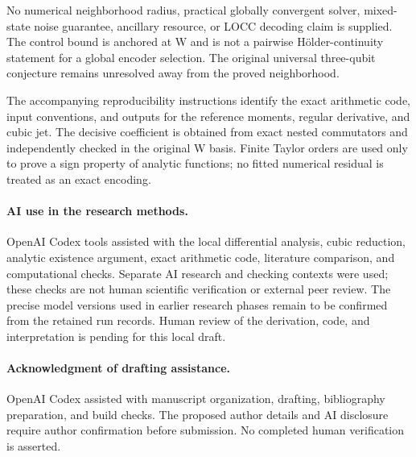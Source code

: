 \documentclass[11pt]{article}
\begin{document}
No numerical neighborhood radius, practical globally convergent solver, mixed-state noise guarantee, ancillary resource, or LOCC decoding claim is supplied. The control bound is anchored at W and is not a pairwise H\"older-continuity statement for a global encoder selection. The original universal three-qubit conjecture remains unresolved away from the proved neighborhood.

The accompanying reproducibility instructions identify the exact arithmetic code, input conventions, and outputs for the reference moments, regular derivative, and cubic jet. The decisive coefficient is obtained from exact nested commutators and independently checked in the original W basis. Finite Taylor orders are used only to prove a sign property of analytic functions; no fitted numerical residual is treated as an exact encoding.

\paragraph{AI use in the research methods.}
OpenAI Codex tools assisted with the local differential analysis, cubic reduction, analytic existence argument, exact arithmetic code, literature comparison, and computational checks. Separate AI research and checking contexts were used; these checks are not human scientific verification or external peer review. The precise model versions used in earlier research phases remain to be confirmed from the retained run records. Human review of the derivation, code, and interpretation is pending for this local draft.

\paragraph{Acknowledgment of drafting assistance.}
OpenAI Codex assisted with manuscript organization, drafting, bibliography preparation, and build checks. The proposed author details and AI disclosure require author confirmation before submission. No completed human verification is asserted.



\end{document}

